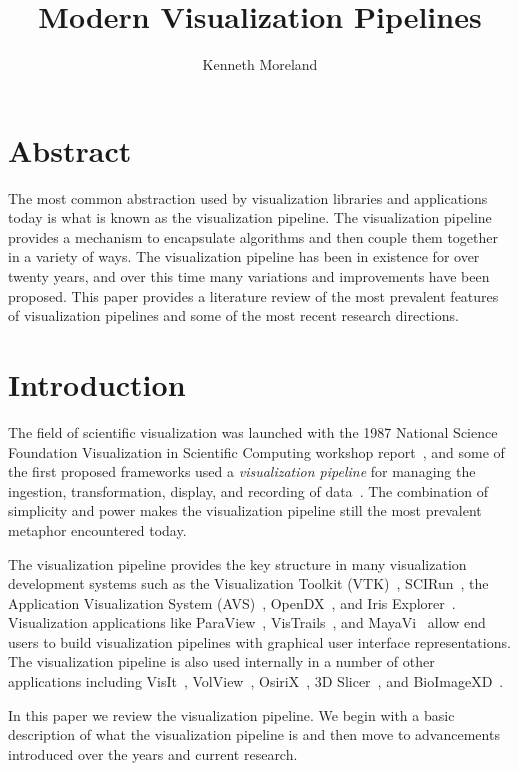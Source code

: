 \documentclass{article}
\title{Modern Visualization Pipelines}
\author{Kenneth Moreland}
\date{}
\newcommand*{\lcite}[1]{~\cite{#1}}
\newcommand*{\keyterm}[1]{\emph{#1}}
\begin{document}
\maketitle


\section*{Abstract}

The most common abstraction used by visualization libraries and
applications today is what is known as the visualization pipeline.  The
visualization pipeline provides a mechanism to encapsulate algorithms and
then couple them together in a variety of ways.  The visualization pipeline
has been in existence for over twenty years, and over this time many
variations and improvements have been proposed.  This paper provides a
literature review of the most prevalent features of visualization pipelines
and some of the most recent research directions.


\section{Introduction}
\label{sec:Introduction}

The field of scientific visualization was launched with the 1987 National
Science Foundation Visualization in Scientific Computing workshop
report\lcite{ViSC1987}, and some of the first proposed frameworks used a
\keyterm{visualization pipeline} for managing the ingestion,
transformation, display, and recording of
data\lcite{Haeberli1988,Lucas1992}.  The combination of simplicity and
power makes the visualization pipeline still the most prevalent metaphor
encountered today.

The visualization pipeline provides the key
structure in many visualization development systems such as the
Visualization Toolkit (VTK)\lcite{VTK}, SCIRun\lcite{SCIRun}, the
Application Visualization System (AVS)\lcite{AVS}, OpenDX\lcite{OpenDX},
and Iris Explorer\lcite{IRISExplorer}.  Visualization applications like
ParaView\lcite{ParaView}, VisTrails\lcite{VisTrails}, and
MayaVi\lcite{MayaVi} allow end users to build visualization pipelines with
graphical user interface representations.  The visualization pipeline is
also used internally in a number of other applications including
VisIt\lcite{VisIt}, VolView\lcite{VolView}, OsiriX\lcite{OsiriX}, 3D
Slicer\lcite{3DSlicer}, and BioImageXD\lcite{BioImageXD}.

In this paper we review the visualization pipeline.  We begin with a basic
description of what the visualization pipeline is and then move to
advancements introduced over the years and current research.
\end{document}
